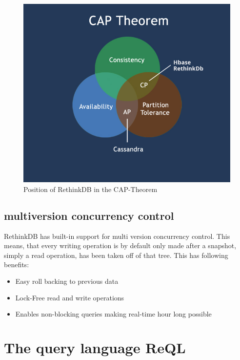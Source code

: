 \begin{figure}[H]
	\begin{center}
		\includegraphics[scale=0.6,keepaspectratio]{images/captheoremnosql.jpg}
		\caption{Position of RethinkDB in the CAP-Theorem \protect\cite{rdbcaptheorem}}
	\end{center}
\end{figure}

\subsection{multiversion concurrency control}
\label{mvcc}

RethinkDB has built-in support for multi version concurrency control. This means, that every writing operation is by default only made after a snapshot, simply a read operation, has been taken off of that tree. This has following benefits:
\begin{itemize}
	\item Easy roll backing to previous data
	\item Lock-Free read and write operations
	\item Enables non-blocking queries making real-time hour long possible
\end{itemize}
\cite["How are concurrent queries handled?
"]{RethinkQE}

\section{The query language ReQL}

